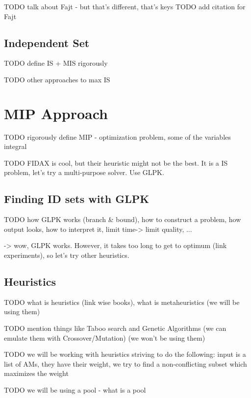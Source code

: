\documentclass[a4paper,12pt,oneside]{report}
\theoremstyle{definition}
\begin{document}
TODO talk about Fajt - but that's different, that's keys
TODO add citation for Fajt

\section{Independent Set}

TODO define IS + MIS rigorously

TODO other approaches to max IS

\chapter{MIP Approach}

TODO rigorously define MIP - optimization problem, some of the variables integral

TODO FIDAX is cool, but their heuristic might not be the best. It is a IS problem, let's try a multi-purpose solver. Use GLPK. 

\section{Finding ID sets with GLPK}

TODO how GLPK works (branch \& bound), how to construct a problem, how output looks, how to interpret it, limit time-> limit quality, ...
 
 -> wow, GLPK works. However, it takes too long to get to optimum (link experiments), so let's try other heuristics.
 
\section{Heuristics}

TODO what is heuristics (link wise books), what is metaheuristics (we will be using them)

TODO mention things like Taboo search and Genetic Algorithms (we can emulate them with Crossover/Mutation) (we won't be using them)

TODO we will be working with heuristics striving to do the following: input is a list of AMs, they have their weight, we try to find a non-conflicting subset which maximizes the weight

TODO we will be using a pool - what is a pool
\end{document}
